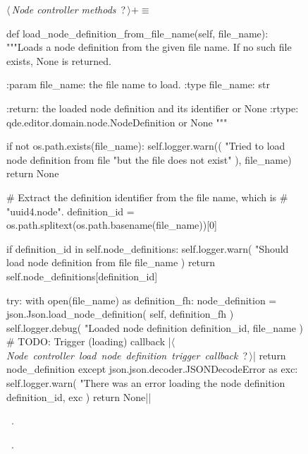 \documentclass[%
    a4paper,    %
    justified,  %
    nobib,      %
    openany     %
]{tufte-book}
\makeatletter
\renewcommand{\label}[1]{\@tufte@label{##1}}%
\makeatother
\begin{document}
\begin{figure}
\begin{flushleft} \small
\begin{minipage}{\linewidth}\label{scrap124}\raggedright\small
{} $\langle\,${\itshape Node controller methods}\nobreak\ {\footnotesize {?}}$\,\rangle+\equiv$
\vspace{-1ex}
\begin{pythoncode}
def load_node_definition_from_file_name(self, file_name):
    """Loads a node definition from the given file name.
    If no such file exists, None is returned.

    :param file_name: the file name to load.
    :type  file_name: str

    :return: the loaded node definition and its identifier or None
    :rtype:  qde.editor.domain.node.NodeDefinition or None
    """

    if not os.path.exists(file_name):
        self.logger.warn((
            "Tried to load node definition from file %
            "but the file does not exist"
        ), file_name)
        return None

    # Extract the definition identifier from the file name, which is
    # "uuid4.node".
    definition_id = os.path.splitext(os.path.basename(file_name))[0]

    if definition_id in self.node_definitions:
        self.logger.warn(
            "Should load node definition from file %
            file_name
        )
        return self.node_definitions[definition_id]

    try:
        with open(file_name) as definition_fh:
            node_definition = json.Json.load_node_definition(
                self, definition_fh
            )
            self.logger.debug(
                "Loaded node definition %
                definition_id, file_name
            )
            # TODO: Trigger (loading) callback
            |\hbox{$\langle\,${\itshape Node controller load node definition trigger callback}\nobreak\ {\footnotesize ?}$\,\rangle$}|
            return node_definition
    except json.json.decoder.JSONDecodeError as exc:
        self.logger.warn(
            "There was an error loading the node definition %
            definition_id, exc
        )
        return None|\NWsep|
\end{pythoncode}
\vspace{1.5ex}
\footnotesize
\begin{list}{}{\setlength{\itemsep}{-\parsep}\setlength{\itemindent}{-\leftmargin}}
\item \NWtxtMacroDefBy\ .
\item \NWtxtMacroRefIn\ .


\end{list}
\end{minipage}
\end{flushleft}
\end{figure}
\end{document}
